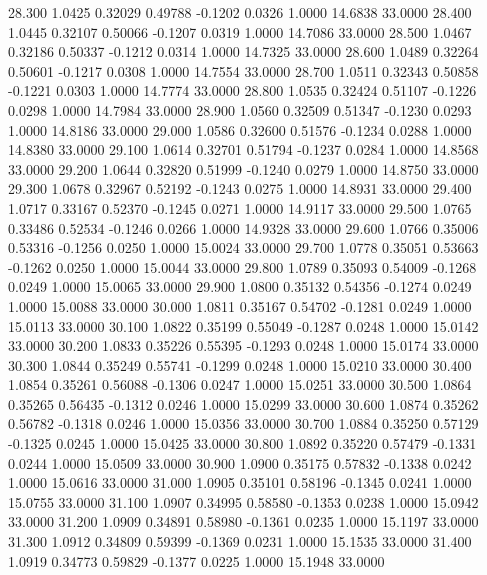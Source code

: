   28.300   1.0425   0.32029   0.49788  -0.1202   0.0326   1.0000  14.6838  33.0000
  28.400   1.0445   0.32107   0.50066  -0.1207   0.0319   1.0000  14.7086  33.0000
  28.500   1.0467   0.32186   0.50337  -0.1212   0.0314   1.0000  14.7325  33.0000
  28.600   1.0489   0.32264   0.50601  -0.1217   0.0308   1.0000  14.7554  33.0000
  28.700   1.0511   0.32343   0.50858  -0.1221   0.0303   1.0000  14.7774  33.0000
  28.800   1.0535   0.32424   0.51107  -0.1226   0.0298   1.0000  14.7984  33.0000
  28.900   1.0560   0.32509   0.51347  -0.1230   0.0293   1.0000  14.8186  33.0000
  29.000   1.0586   0.32600   0.51576  -0.1234   0.0288   1.0000  14.8380  33.0000
  29.100   1.0614   0.32701   0.51794  -0.1237   0.0284   1.0000  14.8568  33.0000
  29.200   1.0644   0.32820   0.51999  -0.1240   0.0279   1.0000  14.8750  33.0000
  29.300   1.0678   0.32967   0.52192  -0.1243   0.0275   1.0000  14.8931  33.0000
  29.400   1.0717   0.33167   0.52370  -0.1245   0.0271   1.0000  14.9117  33.0000
  29.500   1.0765   0.33486   0.52534  -0.1246   0.0266   1.0000  14.9328  33.0000
  29.600   1.0766   0.35006   0.53316  -0.1256   0.0250   1.0000  15.0024  33.0000
  29.700   1.0778   0.35051   0.53663  -0.1262   0.0250   1.0000  15.0044  33.0000
  29.800   1.0789   0.35093   0.54009  -0.1268   0.0249   1.0000  15.0065  33.0000
  29.900   1.0800   0.35132   0.54356  -0.1274   0.0249   1.0000  15.0088  33.0000
  30.000   1.0811   0.35167   0.54702  -0.1281   0.0249   1.0000  15.0113  33.0000
  30.100   1.0822   0.35199   0.55049  -0.1287   0.0248   1.0000  15.0142  33.0000
  30.200   1.0833   0.35226   0.55395  -0.1293   0.0248   1.0000  15.0174  33.0000
  30.300   1.0844   0.35249   0.55741  -0.1299   0.0248   1.0000  15.0210  33.0000
  30.400   1.0854   0.35261   0.56088  -0.1306   0.0247   1.0000  15.0251  33.0000
  30.500   1.0864   0.35265   0.56435  -0.1312   0.0246   1.0000  15.0299  33.0000
  30.600   1.0874   0.35262   0.56782  -0.1318   0.0246   1.0000  15.0356  33.0000
  30.700   1.0884   0.35250   0.57129  -0.1325   0.0245   1.0000  15.0425  33.0000
  30.800   1.0892   0.35220   0.57479  -0.1331   0.0244   1.0000  15.0509  33.0000
  30.900   1.0900   0.35175   0.57832  -0.1338   0.0242   1.0000  15.0616  33.0000
  31.000   1.0905   0.35101   0.58196  -0.1345   0.0241   1.0000  15.0755  33.0000
  31.100   1.0907   0.34995   0.58580  -0.1353   0.0238   1.0000  15.0942  33.0000
  31.200   1.0909   0.34891   0.58980  -0.1361   0.0235   1.0000  15.1197  33.0000
  31.300   1.0912   0.34809   0.59399  -0.1369   0.0231   1.0000  15.1535  33.0000
  31.400   1.0919   0.34773   0.59829  -0.1377   0.0225   1.0000  15.1948  33.0000
